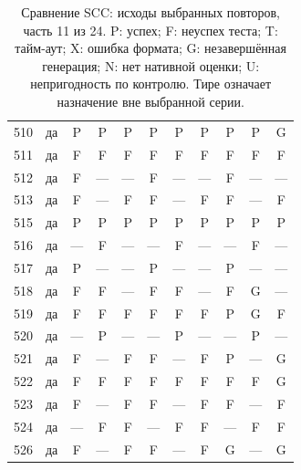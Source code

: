 \begin{table}[p]
\begin{tabular*}{\textwidth}{@{\extracolsep{\fill}}rc*{9}{c}@{}}
510 & да & P & P & P & P & P & P & P & P & G\\
511 & да & F & F & F & F & F & F & F & F & F\\
512 & да & F & — & — & F & — & — & F & — & —\\
513 & да & F & — & F & F & — & F & F & — & F\\
515 & да & P & P & P & P & P & P & P & P & P\\
516 & да & — & F & — & — & F & — & — & F & —\\
517 & да & P & — & — & P & — & — & P & — & —\\
518 & да & F & F & — & F & F & — & F & G & —\\
519 & да & F & F & F & F & F & F & P & G & F\\
520 & да & — & P & — & — & P & — & — & P & —\\
521 & да & F & — & F & F & — & F & P & — & G\\
522 & да & F & F & F & F & F & F & F & F & G\\
523 & да & F & — & F & F & — & F & F & — & F\\
524 & да & — & F & F & — & F & F & — & F & F\\
526 & да & F & — & F & F & — & F & G & — & G\\
\bottomrule\end{tabular*}
\caption{Сравнение SCC: исходы выбранных повторов, часть 11 из 24. P: успех; F: неуспех теста; T: тайм-аут; X: ошибка формата; G: незавершённая генерация; N: нет нативной оценки; U: непригодность по контролю. Тире означает назначение вне выбранной серии.}
\end{table}
\clearpage
